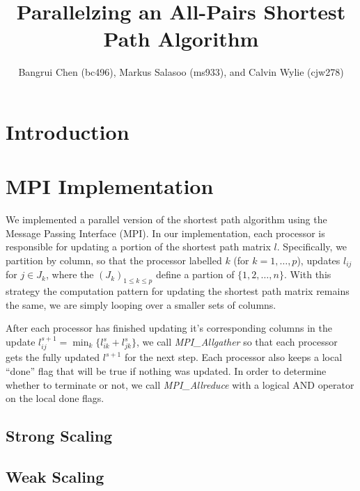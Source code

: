 \documentclass[11pt]{article}
\title{Parallelzing an All-Pairs Shortest Path Algorithm}
\author{Bangrui Chen (bc496), Markus Salasoo (ms933), and Calvin Wylie (cjw278)}
\begin{document}
\maketitle

\section*{Introduction}

\section*{MPI Implementation}

We implemented a parallel version of the shortest path algorithm using the
Message Passing Interface (MPI).
In our implementation, each processor is responsible for updating a portion of 
the shortest path matrix $l$.  Specifically, we partition by column, so that 
the processor labelled $k$ (for $k = 1, \ldots, p$), updates $l_{ij}$ for 
$j \in J_k$, where the $(J_k)_{1 \leq k \leq p}$ define a partion of 
$\{1, 2, \ldots, n\}$.
With this strategy the computation pattern for updating the shortest path matrix
remains the same, we are simply looping over a smaller sets of columns.

After each processor has finished updating it's corresponding columns in
the update $l_{ij}^{s+1} = \min_k \{ l^s_{ik} + l^s_{jk} \}$, we call
\emph{MPI\_Allgather} so that each processor gets the fully updated $l^{s+1}$
for the next step.  Each processor also keeps a local ``done'' flag that will
be true if nothing was updated.  In order to determine whether to terminate
or not, we call \emph{MPI\_Allreduce} with a logical AND operator on the local
done flags.

\subsection*{Strong Scaling}

\subsection*{Weak Scaling}
\end{document}
